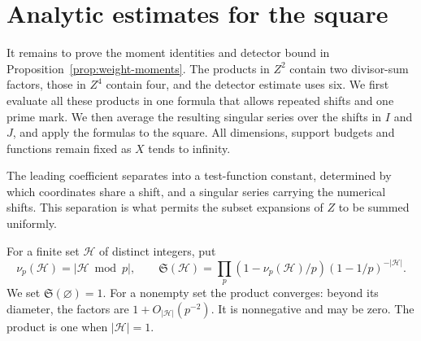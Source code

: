 \section{Analytic estimates for the square}\label{sec:moments}

It remains to prove the moment identities and detector bound in
Proposition~\ref{prop:weight-moments}. The products in $Z^2$ contain two
divisor-sum factors, those in $Z^4$ contain four, and the detector estimate
uses six. We first evaluate all these products in one formula that allows
repeated shifts and one prime mark. We then average the resulting singular
series over the shifts in $I$ and $J$, and apply the formulas to the square.
All dimensions, support budgets and functions remain fixed as $X$ tends
to infinity.

The leading coefficient separates into a test-function constant, determined
by which coordinates share a shift, and a singular series carrying the
numerical shifts. This separation is what permits the subset expansions
of $Z$ to be summed uniformly.

For a finite set $\mathcal H$ of distinct integers, put
\[
 \nu_p(\mathcal H)=|\mathcal H\bmod p|,\qquad
 \mathfrak S(\mathcal H)=\prod_p
 (1-\nu_p(\mathcal H)/p)(1-1/p)^{-|\mathcal H|}.
\]
We set $\mathfrak S(\varnothing)=1$. For a nonempty set the product converges:
beyond its diameter, the factors are $1+O_{|\mathcal H|}(p^{-2})$. It is nonnegative
and may be zero. The product is one when $|\mathcal H|=1$.

